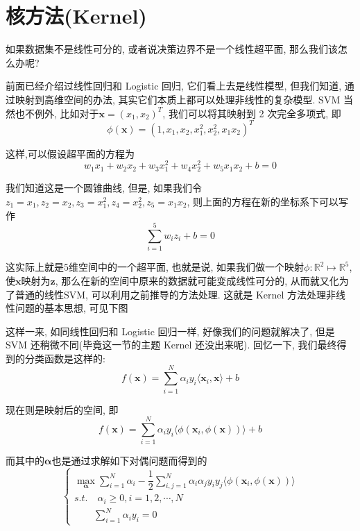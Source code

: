\documentclass[a4paper,UTF8]{ctexart}
\theoremstyle{plain} \newtheorem{theorem}{定理}[section]
\theoremstyle{plain} \newtheorem{definition}{定义}[section]
\theoremstyle{plain} \newtheorem{lemma}{引理}[section]
\theoremstyle{plain} \newtheorem{proposition}{命题}[section]
\theoremstyle{plain} \newtheorem{example}{例}
\theoremstyle{plain} \newtheorem{remark}{注}
\theoremstyle{plain} \newtheorem{corollary}{推论}[section]
\begin{document}
\section{核方法(Kernel)}
如果数据集不是线性可分的, 或者说决策边界不是一个线性超平面, 那么我们该怎么办呢?

前面已经介绍过线性回归和 Logistic 回归, 它们看上去是线性模型, 但我们知道, 通过映射到高维空间的办法, 其实它们本质上都可以处理非线性的复杂模型. SVM 当然也不例外, 比如对于$\bm{x} = (x_1, x_2)^{T}$, 我们可以将其映射到 2 次完全多项式, 即
\begin{equation*}
\phi(\bm{x}) = (1,x_1,x_2,x_{1}^{2},x_{2}^{2},x_{1}x_{2})^{T}
\end{equation*}

这样,可以假设超平面的方程为
\begin{equation*}
w_{1} x_{1} + w_{2} x_{2} + w_{3} x_{1}^{2} + w_{4} x_{2}^{2} + w_{5} x_1 x_2 + b = 0
\end{equation*}

我们知道这是一个圆锥曲线, 但是, 如果我们令$z_{1}=x_{1},z_{2}=x_{2},z_{3}=x_{1}^{2},z_{4}=x_{2}^{2},z_{5}=x_{1}x_{2}$, 则上面的方程在新的坐标系下可以写作
\begin{equation*}
\sum_{i=1}^{5} w_{i} z_{i} + b = 0
\end{equation*}

这实际上就是$5$维空间中的一个超平面, 也就是说, 如果我们做一个映射$\phi : \mathbb{R}^{2} \mapsto \mathbb{R}^{5}$, 使$\bm{x}$映射为$\bm{z}$, 那么在新的空间中原来的数据就可能变成线性可分的, 从而就又化为了普通的线性SVM, 可以利用之前推导的方法处理. 这就是 Kernel 方法处理非线性问题的基本思想, 可见下图





这样一来, 如同线性回归和 Logistic 回归一样, 好像我们的问题就解决了, 但是 SVM 还稍微不同(毕竟这一节的主题 Kernel 还没出来呢). 回忆一下, 我们最终得到的分类函数是这样的:
\begin{equation*}
f(\bm{x}) = \sum_{i=1}^{N} \alpha_{i} y_{i} \langle \bm{x}_{i}, \bm{x} \rangle + b
\end{equation*}

现在则是映射后的空间, 即
\begin{equation*}
f(\bm{x}) = \sum_{i=1}^{N} \alpha_{i} y_{i} \langle \phi(\bm{x}_{i}, \phi(\bm{x})) \rangle + b
\end{equation*}

而其中的$\bm{\alpha}$也是通过求解如下对偶问题而得到的
$$
\begin{cases}
\max\limits_{\bm{\alpha}}  \sum\limits_{i=1}^{N} \alpha_{i} - \dfrac{1}{2} \sum\limits_{i,j=1}^{N} \alpha_{i} \alpha_{j} y_{i} y_{j}  \langle \phi(\bm{x}_{i}, \phi(\bm{x})) \rangle \\ 
s.t. \quad \alpha_{i} \geqslant 0, i=1,2,\cdots,N \\ 
\qquad \sum\limits_{i=1}^{N} \alpha_{i} y_{i} = 0
\end{cases}
$$
\end{document}
